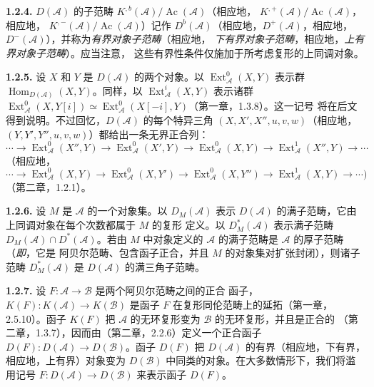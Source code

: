 \clearpage
{}%
\begingroup\small\setlength{\parskip}{0pt}\setlength{\emergencystretch}{1.5em}
\setlength{\abovedisplayskip}{4pt plus 2pt minus 2pt}%
\setlength{\belowdisplayskip}{4pt plus 2pt minus 2pt}%

\noindent\textbf{1.2.4.}\quad
$D(\mathcal A)$ 的子范畴
$K^{,b}(\mathcal A)/\operatorname{Ac}(\mathcal A)$（相应地，
$K^{,+}(\mathcal A)/\operatorname{Ac}(\mathcal A)$，相应地，
$K^{,-}(\mathcal A)/\operatorname{Ac}(\mathcal A)$）记作
$D^b(\mathcal A)$（相应地，$D^+(\mathcal A)$，相应地，
$D^-(\mathcal A)$），并称为\emph{有界对象子范畴}（相应地，
\emph{下有界对象子范畴}，相应地，\emph{上有界对象子范畴}）。应当注意，
这些有界性条件仅施加于所考虑复形的上同调对象。

\medskip\noindent\textbf{1.2.5.}\quad
设 $X$ 和 $Y$ 是 $D(\mathcal A)$ 的两个对象。以
$\operatorname{Ext}_{\mathcal A}^{0}(X,Y)$ 表示群
$\operatorname{Hom}_{D(\mathcal A)}(X,Y)$。同样，以
$\operatorname{Ext}_{\mathcal A}^{i}(X,Y)$ 表示诸群
$\operatorname{Ext}_{\mathcal A}^{0}(X,Y[i])\simeq
\operatorname{Ext}_{\mathcal A}^{0}(X[-i],Y)$（第一章，1.3.8）。这一记号
将在后文得到说明。不过回忆，$D(\mathcal A)$ 的每个特异三角
$(X,X',X'',u,v,w)$（相应地，$(Y,Y',Y'',u,v,w)$）都给出一条无界正合列：
\[
\cdots\longrightarrow \operatorname{Ext}_{\mathcal A}^{0}(X'',Y)
\longrightarrow \operatorname{Ext}_{\mathcal A}^{0}(X',Y)
\longrightarrow \operatorname{Ext}_{\mathcal A}^{0}(X,Y)
\longrightarrow \operatorname{Ext}_{\mathcal A}^{1}(X'',Y)
\longrightarrow\cdots
\]
（相应地，
\[
\cdots\longrightarrow \operatorname{Ext}_{\mathcal A}^{0}(X,Y)
\longrightarrow \operatorname{Ext}_{\mathcal A}^{0}(X,Y')
\longrightarrow \operatorname{Ext}_{\mathcal A}^{0}(X,Y'')
\longrightarrow \operatorname{Ext}_{\mathcal A}^{1}(X,Y)
\longrightarrow\cdots )
\]
（第二章，1.2.1）。

\medskip\noindent\textbf{1.2.6.}\quad
设 $M$ 是 $\mathcal A$ 的一个对象集。以 $D_M(\mathcal A)$ 表示
$D(\mathcal A)$ 的满子范畴，它由上同调对象在每个次数都属于 $M$ 的复形
定义。以 $D_M^*(\mathcal A)$ 表示满子范畴
$D_M(\mathcal A)\cap D^*(\mathcal A)$。若由 $M$ 中对象定义的
$\mathcal A$ 的满子范畴是 $\mathcal A$ 的厚子范畴（\textit{即}，它是
阿贝尔范畴、包含函子正合，并且 $M$ 的对象集对扩张封闭），则诸子范畴
$D_M^*(\mathcal A)$ 是 $D(\mathcal A)$ 的满三角子范畴。

\medskip\noindent\textbf{1.2.7.}\quad
设 $F\colon\mathcal A\longrightarrow\mathcal B$ 是两个阿贝尔范畴之间的正合
函子，$K(F)\colon K(\mathcal A)\longrightarrow K(\mathcal B)$ 是函子 $F$
在复形同伦范畴上的延拓（第一章，2.5.10）。函子 $K(F)$ 把
$\mathcal A$ 的无环复形变为 $\mathcal B$ 的无环复形，并且是正合的
（第二章，1.3.7），因而由（第二章，2.2.6）定义一个正合函子
$D(F)\colon D(\mathcal A)\longrightarrow D(\mathcal B)$。函子 $D(F)$
把 $D(\mathcal A)$ 的有界（相应地，下有界，相应地，上有界）对象变为
$D(\mathcal B)$ 中同类的对象。在大多数情形下，我们将滥用记号
$F\colon D(\mathcal A)\longrightarrow D(\mathcal B)$ 来表示函子 $D(F)$。

